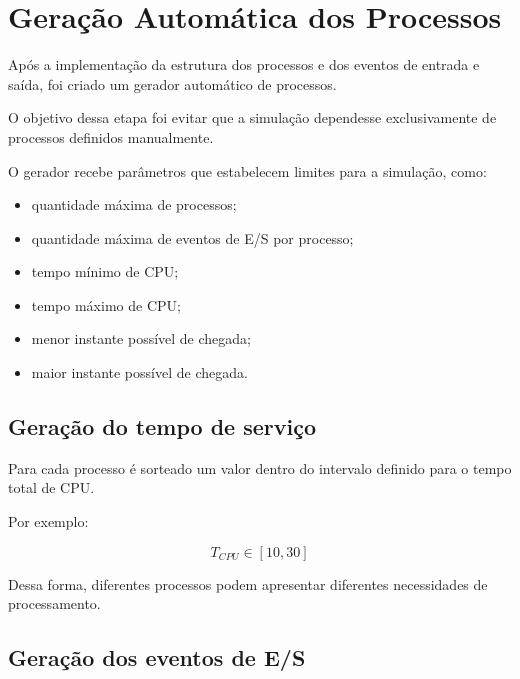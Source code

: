 \documentclass[12pt,a4paper]{article}
\begin{document}
\section{Geração Automática dos Processos}

Após a implementação da estrutura dos processos e dos eventos de
entrada e saída, foi criado um gerador automático de processos.

O objetivo dessa etapa foi evitar que a simulação dependesse
exclusivamente de processos definidos manualmente.

O gerador recebe parâmetros que estabelecem limites para a
simulação, como:

\begin{itemize}

    \item quantidade máxima de processos;

    \item quantidade máxima de eventos de E/S por processo;

    \item tempo mínimo de CPU;

    \item tempo máximo de CPU;

    \item menor instante possível de chegada;

    \item maior instante possível de chegada.

\end{itemize}



\subsection{Geração do tempo de serviço}

Para cada processo é sorteado um valor dentro do intervalo definido
para o tempo total de CPU.

Por exemplo:

\[
T_{CPU} \in [10,30]
\]

Dessa forma, diferentes processos podem apresentar diferentes
necessidades de processamento.



\subsection{Geração dos eventos de E/S}
\end{document}
